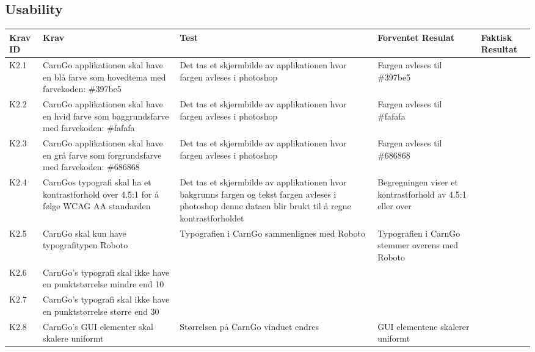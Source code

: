 \documentclass[Accepttestspecifikation/Accepttest_Main.tex]{subfiles}
\begin{document}
\subsection{Usability}
\begin{table}[H]
\centering
\begin{tabular}{|L{0.07\textwidth}|L{0.2\textwidth}|L{0.2\textwidth}|L{0.2\textwidth}|L{0.2\textwidth}|}
\hline
\textbf{Krav ID} & \textbf{Krav} & \textbf{Test} & \textbf{Forventet Resulat} & \textbf{Faktisk Resultat} \\ \hline
K2.1 & CarnGo applikationen skal have en blå farve som hovedtema med farvekoden: \#397be5  & Det tas et skjermbilde av applikationen hvor fargen avleses i photoshop & Fargen avleses til \#397be5 &  \\ \hline
K2.2 & CarnGo applikationen skal have en hvid farve som baggrundsfarve med farvekoden: \#fafafa & Det tas et skjermbilde av applikationen hvor fargen avleses i photoshop & Fargen avleses til \#fafafa &  \\ \hline
K2.3 & CarnGo applikationen skal have en grå farve som forgrundsfarve med farvekoden: \#686868  & Det tas et skjermbilde av applikationen hvor fargen avleses i photoshop & Fargen avleses til \#686868 &  \\ \hline
K2.4 & CarnGos typografi skal ha et kontrastforhold over 4.5:1 for å følge WCAG AA standarden & Det tas et skjermbilde av applikationen hvor bakgrunns fargen og tekst fargen avleses i photoshop denne dataen blir brukt til å regne kontrastforholdet & Begregningen viser et kontrastforhold av 4.5:1 eller over &  \\ \hline
K2.5 & CarnGo skal kun have typografitypen Roboto & Typografien i CarnGo sammenlignes med Roboto & Typografien i CarnGo stemmer overens med Roboto &  \\ \hline
K2.6 & CarnGo's typografi skal ikke have en punktstørrelse mindre end 10 &  &  &  \\ \hline
K2.7 & CarnGo's typografi skal ikke have en punktstørrelse større end 30 &  &  &  \\ \hline
K2.8 & CarnGo's GUI elementer skal skalere uniformt & Størrelsen på CarnGo vinduet endres & GUI elementene skalerer uniformt &  \\ \hline
\end{tabular}
\end{table}
\end{document}

